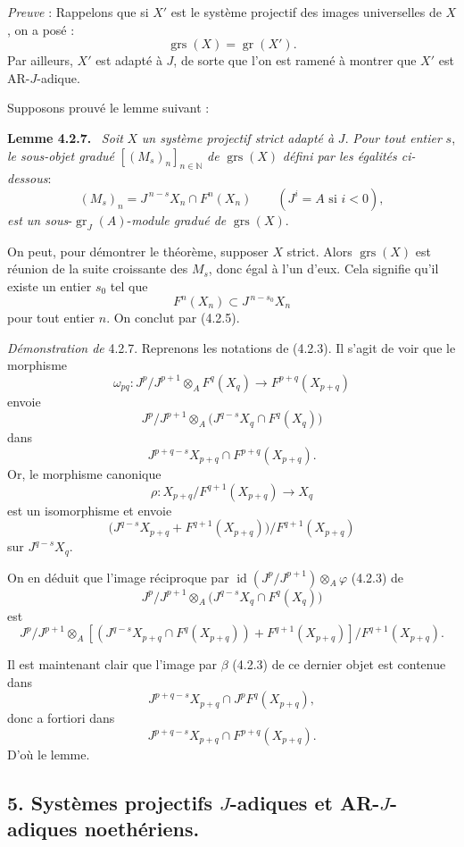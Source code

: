 \documentclass[11pt]{article}
\newenvironment{statement}[1]{\par\medskip\noindent\textbf{#1.}\ }{\par\medskip}
\providecommand{\gr}{\operatorname{gr}}
\providecommand{\id}{\operatorname{id}}
\providecommand{\id}{\operatorname{id}}
\providecommand{\gr}{\operatorname{gr}}
\providecommand{\gr}{\operatorname{gr}}
\providecommand{\grs}{\operatorname{grs}}
\providecommand{\id}{\operatorname{id}}
\providecommand{\id}{\operatorname{id}}
\providecommand{\id}{\operatorname{id}}
\providecommand{\id}{\operatorname{id}}
\begin{document}
\emph{Preuve} : Rappelons que si \(X'\) est le système projectif des images universelles de \(X\), on a posé :
\[
\grs(X)=\gr(X').
\]
Par ailleurs, \(X'\) est adapté à \(J\), de sorte que l'on est ramené à montrer que \(X'\) est AR-\(J\)-adique.

Supposons prouvé le lemme suivant :

\begin{statement}{Lemme 4.2.7}
\emph{Soit} \(X\) \emph{un système projectif strict adapté à} \(J\). \emph{Pour tout entier} \(s\), \emph{le sous-objet gradué} \([(M_s)_n]_{n\in\mathbb N}\) \emph{de} \(\grs(X)\) \emph{défini par les égalités ci-dessous}:
\[
(M_s)_n=J^{\,n-s}X_n\cap F^n(X_n)\qquad(J^i=A\text{ si }i<0),
\]
\emph{est un
sous}-\(\gr_J(A)\)-\emph{module gradué de} \(\grs(X)\).
\end{statement}

On peut, pour démontrer le théorème, supposer \(X\) strict. Alors \(\grs(X)\) est réunion de la suite croissante des \(M_s\), donc égal à l'un d'eux. Cela signifie qu'il existe un entier \(s_0\) tel que
\[
F^n(X_n)\subset J^{\,n-s_0}X_n
\]
pour tout entier \(n\). On conclut par (4.2.5).

\emph{Démonstration de} 4.2.7. Reprenons les notations de (4.2.3). Il s'agit de voir que le morphisme
\[
\omega_{pq}:J^p/J^{p+1}\otimes_A F^q(X_q)\longrightarrow F^{p+q}(X_{p+q})
\]
envoie
\[
J^p/J^{p+1}\otimes_A
\bigl(J^{q-s}X_q\cap F^q(X_q)\bigr)
\]
dans
\[
J^{p+q-s}X_{p+q}\cap F^{p+q}(X_{p+q}).
\]
Or, le morphisme canonique
\[
\rho:X_{p+q}/F^{q+1}(X_{p+q})\longrightarrow X_q
\]
est un isomorphisme et envoie
\[
\bigl(J^{q-s}X_{p+q}+F^{q+1}(X_{p+q})\bigr)/F^{q+1}(X_{p+q})
\]
sur \(J^{q-s}X_q\).

On en déduit que l'image réciproque par
\(\id(J^p/J^{p+1})\otimes_A\varphi\) (4.2.3) de
\[
J^p/J^{p+1}\otimes_A
\bigl(J^{q-s}X_q\cap F^q(X_q)\bigr)
\]
est
\[
J^p/J^{p+1}\otimes_A
[(J^{q-s}X_{p+q}\cap F^q(X_{p+q}))+F^{q+1}(X_{p+q})]/F^{q+1}(X_{p+q}).
\]

Il est maintenant clair que l'image par \(\beta\) (4.2.3) de ce dernier objet est contenue dans
\[
J^{p+q-s}X_{p+q}\cap J^pF^q(X_{p+q}),
\]
donc a fortiori dans
\[
J^{p+q-s}X_{p+q}\cap F^{p+q}(X_{p+q}).
\]
D'où le lemme.

\subsection*{5. Systèmes projectifs \(J\)-adiques et AR-\(J\)-adiques noethériens.}
\end{document}
